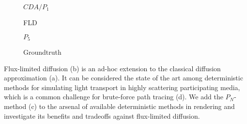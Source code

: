 \teaser
{
\centering
\begin{subfigure}{0.2\linewidth}
\missingfigure{}
\caption{$CDA/P_1$}
\end{subfigure}%
\hspace{0.05\linewidth}
\begin{subfigure}{0.2\linewidth}
\missingfigure{}
\caption{FLD}
\end{subfigure}%
\hspace{0.05\linewidth}
\begin{subfigure}{0.2\linewidth}
\missingfigure{}
\caption{$P_5$}
\end{subfigure}%
\hspace{0.05\linewidth}
\begin{subfigure}{0.2\linewidth}
\missingfigure{}
\caption{Groundtruth}
\end{subfigure}%
\icaption
{
Flux-limited diffusion (b) is an ad-hoc extension to the classical diffusion approximation (a). It can be considered the state of the art among deterministic methods for simulating light transport in highly scattering participating media, which is a common challenge for brute-force path tracing (d). We add the $P_N$-method (c) to the arsenal of available deterministic methods in rendering and investigate its benefits and tradeoffs against flux-limited diffusion.
}
\label{fig:teaser}
}



\maketitle


